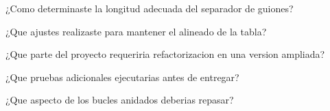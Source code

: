 
\begin{DoxyEnumerate}
\item ¿\+Como determinaste la longitud adecuada del separador de guiones?
\item ¿\+Que ajustes realizaste para mantener el alineado de la tabla?
\item ¿\+Que parte del proyecto requeriria refactorizacion en una version ampliada?
\item ¿\+Que pruebas adicionales ejecutarias antes de entregar?
\item ¿\+Que aspecto de los bucles anidados deberias repasar? 
\end{DoxyEnumerate}